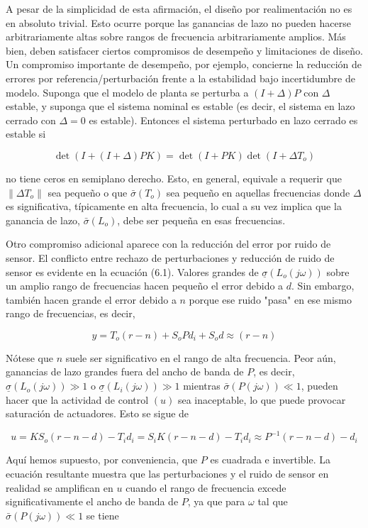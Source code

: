 A pesar de la simplicidad de esta afirmación, el diseño por realimentación no es en absoluto trivial. Esto ocurre porque las ganancias de lazo no pueden hacerse arbitrariamente altas sobre rangos de frecuencia arbitrariamente amplios. Más bien, deben satisfacer ciertos compromisos de desempeño y limitaciones de diseño. Un compromiso importante de desempeño, por ejemplo, concierne la reducción de errores por referencia/perturbación frente a la estabilidad bajo incertidumbre de modelo. Suponga que el modelo de planta se perturba a $(I+\Delta) P$ con $\Delta$ estable, y suponga que el sistema nominal es estable (es decir, el sistema en lazo cerrado con $\Delta=0$ es estable). Entonces el sistema perturbado en lazo cerrado es estable si

$$
\operatorname{det}(I+(I+\Delta) P K)=\operatorname{det}(I+P K) \operatorname{det}\left(I+\Delta T_{o}\right)
$$

no tiene ceros en semiplano derecho. Esto, en general, equivale a requerir que $\left\|\Delta T_{o}\right\|$ sea pequeño o que $\bar{\sigma}\left(T_{o}\right)$ sea pequeño en aquellas frecuencias donde $\Delta$ es significativa, típicamente en alta frecuencia, lo cual a su vez implica que la ganancia de lazo, $\bar{\sigma}\left(L_{o}\right)$, debe ser pequeña en esas frecuencias.

Otro compromiso adicional aparece con la reducción del error por ruido de sensor. El conflicto entre rechazo de perturbaciones y reducción de ruido de sensor es evidente en la ecuación (6.1). Valores grandes de $\underline{\sigma}\left(L_{o}(j \omega)\right)$ sobre un amplio rango de frecuencias hacen pequeño el error debido a $d$. Sin embargo, también hacen grande el error debido a $n$ porque ese ruido "pasa" en ese mismo rango de frecuencias, es decir,

$$
y=T_{o}(r-n)+S_{o} P d_{i}+S_{o} d \approx(r-n)
$$

Nótese que $n$ suele ser significativo en el rango de alta frecuencia. Peor aún, ganancias de lazo grandes fuera del ancho de banda de $P$, es decir, $\underline{\sigma}\left(L_{o}(j \omega)\right) \gg 1$ o $\underline{\sigma}\left(L_{i}(j \omega)\right) \gg 1$ mientras $\bar{\sigma}(P(j \omega)) \ll 1$, pueden hacer que la actividad de control $(u)$ sea inaceptable, lo que puede provocar saturación de actuadores. Esto se sigue de

$$
u=K S_{o}(r-n-d)-T_{i} d_{i}=S_{i} K(r-n-d)-T_{i} d_{i} \approx P^{-1}(r-n-d)-d_{i}
$$

Aquí hemos supuesto, por conveniencia, que $P$ es cuadrada e invertible. La ecuación resultante muestra que las perturbaciones y el ruido de sensor en realidad se amplifican en $u$ cuando el rango de frecuencia excede significativamente el ancho de banda de $P$, ya que para $\omega$ tal que $\bar{\sigma}(P(j \omega)) \ll 1$ se tiene

